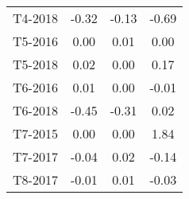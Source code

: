 \begin{tabular}{lccc}
     T4-2018 &                    -0.32 &                   -0.13 &                     -0.69 \\
     T5-2016 &                     0.00 &                    0.01 &                      0.00 \\
     T5-2018 &                     0.02 &                    0.00 &                      0.17 \\
     T6-2016 &                     0.01 &                    0.00 &                     -0.01 \\
     T6-2018 &                    -0.45 &                   -0.31 &                      0.02 \\
     T7-2015 &                     0.00 &                    0.00 &                      1.84 \\
     T7-2017 &                    -0.04 &                    0.02 &                     -0.14 \\
     T8-2017 &                    -0.01 &                    0.01 &                     -0.03 \\
\bottomrule
\end{tabular}
